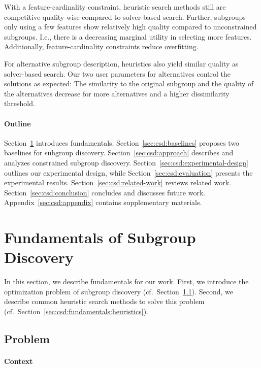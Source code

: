 \documentclass{article}
\theoremstyle{definition}
\begin{document}
With a feature-cardinality constraint, heuristic search methods still are competitive quality-wise compared to solver-based search.
Further, subgroups only using a few features show relatively high quality compared to unconstrained subgroups.
I.e., there is a decreasing marginal utility in selecting more features.
Additionally, feature-cardinality constraints reduce overfitting.

For alternative subgroup description, heuristics also yield similar quality as solver-based search.
Our two user parameters for alternatives control the solutions as expected:
The similarity to the original subgroup and the quality of the alternatives decrease for more alternatives and a higher dissimilarity threshold.

\paragraph{Outline}

Section~\ref{sec:csd:fundamentals} introduces fundamentals.
Section~\ref{sec:csd:baselines} proposes two baselines for subgroup discovery.
Section~\ref{sec:csd:approach} describes and analyzes constrained subgroup discovery.
Section~\ref{sec:csd:experimental-design} outlines our experimental design, while Section~\ref{sec:csd:evaluation} presents the experimental results.
Section~\ref{sec:csd:related-work} reviews related work.
Section~\ref{sec:csd:conclusion} concludes and discusses future work.
Appendix~\ref{sec:csd:appendix} contains supplementary materials.

\section{Fundamentals of Subgroup Discovery}
\label{sec:csd:fundamentals}

In this section, we describe fundamentals for our work.
First, we introduce the optimization problem of subgroup discovery (cf.~Section~\ref{sec:csd:fundamentals:problem}).
Second, we describe common heuristic search methods to solve this problem (cf.~Section~\ref{sec:csd:fundamentals:heuristics}).

\subsection{Problem}
\label{sec:csd:fundamentals:problem}

\paragraph{Context}
\end{document}
